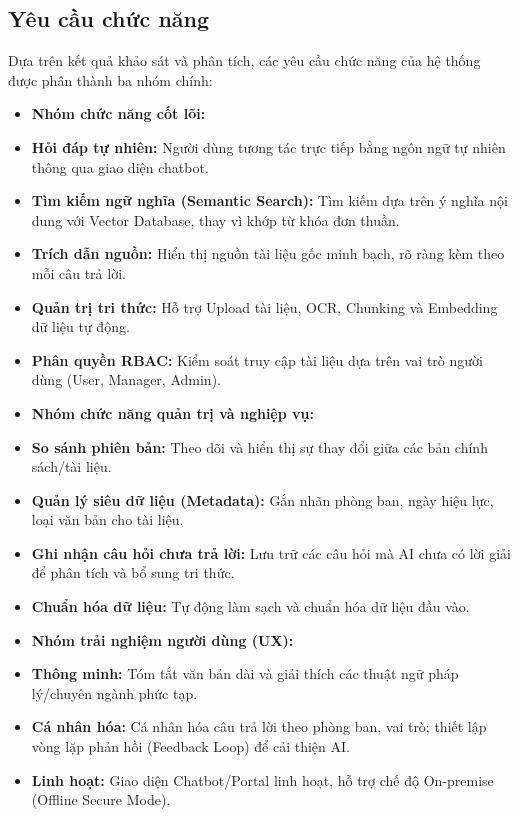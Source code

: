 \documentclass[12pt,a4paper]{report}
\begin{document}
\subsection{Yêu cầu chức năng}
Dựa trên kết quả khảo sát và phân tích, các yêu cầu chức năng của hệ thống được phân thành ba nhóm chính:
\begin{itemize}
    \item \textbf{Nhóm chức năng cốt lõi:}
    \item \textbf{Hỏi đáp tự nhiên:} Người dùng tương tác trực tiếp bằng ngôn ngữ tự nhiên thông qua giao diện chatbot.
    \item \textbf{Tìm kiếm ngữ nghĩa (Semantic Search):} Tìm kiếm dựa trên ý nghĩa nội dung với Vector Database, thay vì khớp từ khóa đơn thuần.
    \item \textbf{Trích dẫn nguồn:} Hiển thị nguồn tài liệu gốc minh bạch, rõ ràng kèm theo mỗi câu trả lời.
    \item \textbf{Quản trị tri thức:} Hỗ trợ Upload tài liệu, OCR, Chunking và Embedding dữ liệu tự động.
    \item \textbf{Phân quyền RBAC:} Kiểm soát truy cập tài liệu dựa trên vai trò người dùng (User, Manager, Admin).
    \item \textbf{Nhóm chức năng quản trị và nghiệp vụ:}
    \item \textbf{So sánh phiên bản:} Theo dõi và hiển thị sự thay đổi giữa các bản chính sách/tài liệu.
    \item \textbf{Quản lý siêu dữ liệu (Metadata):} Gắn nhãn phòng ban, ngày hiệu lực, loại văn bản cho tài liệu.
    \item \textbf{Ghi nhận câu hỏi chưa trả lời:} Lưu trữ các câu hỏi mà AI chưa có lời giải để phân tích và bổ sung tri thức.
    \item \textbf{Chuẩn hóa dữ liệu:} Tự động làm sạch và chuẩn hóa dữ liệu đầu vào.
    \item \textbf{Nhóm trải nghiệm người dùng (UX):}
    \item \textbf{Thông minh:} Tóm tắt văn bản dài và giải thích các thuật ngữ pháp lý/chuyên ngành phức tạp.
    \item \textbf{Cá nhân hóa:} Cá nhân hóa câu trả lời theo phòng ban, vai trò; thiết lập vòng lặp phản hồi (Feedback Loop) để cải thiện AI.
    \item \textbf{Linh hoạt:} Giao diện Chatbot/Portal linh hoạt, hỗ trợ chế độ On-premise (Offline Secure Mode).
\end{itemize}
\end{document}
